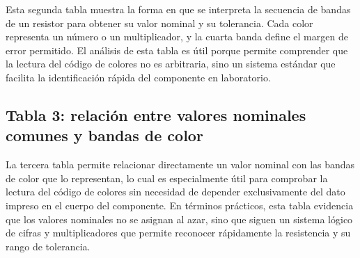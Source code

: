 Esta segunda tabla muestra la forma en que se interpreta la secuencia de bandas de un resistor para obtener su valor nominal y su tolerancia. Cada color representa un número o un multiplicador, y la cuarta banda define el margen de error permitido. El análisis de esta tabla es útil porque permite comprender que la lectura del código de colores no es arbitraria, sino un sistema estándar que facilita la identificación rápida del componente en laboratorio.

\begin{table}[H]
\centering
\caption{Ejemplos de resistencias nominales y sus bandas de color correspondientes.}
\renewcommand{\arraystretch}{0,1}
%
\end{table}

\subsection{Tabla 3: relación entre valores nominales comunes y bandas de color}


La tercera tabla permite relacionar directamente un valor nominal con las bandas de color que lo representan, lo cual es especialmente útil para comprobar la lectura del código de colores sin necesidad de depender exclusivamente del dato impreso en el cuerpo del componente. En términos prácticos, esta tabla evidencia que los valores nominales no se asignan al azar, sino que siguen un sistema lógico de cifras y multiplicadores que permite reconocer rápidamente la resistencia y su rango de tolerancia.

